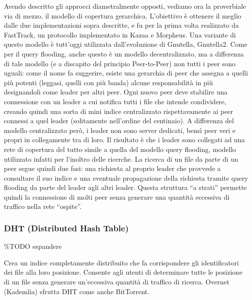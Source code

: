 Avendo descritto gli approcci diametralmente opposti, vediamo ora la
proverbiale via di mezzo, il modello di copertura gerarchica.
L'obiettivo è ottenere il meglio dalle due implementazioni sopra
descritte, e fu per la prima volta realizzato da FastTrack, un
protocollo implementato in Kazaa e Morpheus. Una variante di questo
modello è tutt'oggi utilizzata dall'evoluzione di Gnutella, Gnutella2.
Come per il query flooding, anche questo è un modello decentralizzato,
ma a differenza di tale modello (e a discapito del principio
Peer-to-Peer) non tutti i peer sono uguali: come il nome fa suggerire,
esiste una gerarchia di peer che assegna a quelli più potenti (leggasi,
quelli con più banda) alcune responsabilità in più designandoli come
leader per altri peer. Ogni nuovo peer deve stabilire una connessione
con un leader a cui notifica tutti i file che intende condividere,
creando quindi una sorta di mini indice centralizzato rispettavamente ai
peer connessi a quel leader (solitamente nell'ordine del centinaio). A
differenza del modello centralizzato però, i leader non sono server
dedicati, bensì peer veri e propri in collegamente tra di loro. Il
risultato è che i leader sono collegati ad una rete di copertura del
tutto simile a quella del modello query flooding, modello utilizzato
infatti per l'inoltro delle ricerche. La ricerca di un file da parte di
un peer segue quindi due fasi: una richiesta al proprio leader che
provvede a consultare il suo indice e una eventuale propagazione della
richiesta tramite query flooding da parte del leader agli altri leader.
Questa struttura ``a strati'' permette quindi la connessione di molti
peer senza generare una quantità eccessiva di traffico nella rete
``ospite''.

\subsubsection{DHT (Distributed Hash
Table)}\label{dht-distributed-hash-table}

\%TODO espandere

Crea un indice completamente distribuito che fa corrispondere gli
identificatori dei file alla loro posizione. Consente agli utenti di
determinare tutte le posizione di un file senza generare un'eccessiva
quantità di traffico di ricerca. Overnet (Kademlia) sfrutta DHT come
anche BitTorrent.
